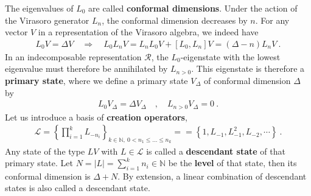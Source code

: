\documentclass[12pt, a4paper]{article}
\theoremstyle{break}
\begin{document}
The eigenvalues of $L_0$ are called \textbf{conformal dimensions}. Under the action of the Virasoro generator $L_n$, the conformal dimension decreases by $n$. For any vector $V$ in a representation of the Virasoro algebra, we indeed have 
\begin{align}
 L_0V{} = \Delta V{} \quad \Rightarrow\quad  L_0 L_nV{} = L_nL_0V{} + [L_0, L_n] V{}  = (\Delta-n)L_nV{} \ .
\end{align}
In an indecomposable representation $\mathcal{R}$, the $L_0$-eigenstate with the lowest eigenvalue must therefore be annihilated by $L_{n>0}$. This eigenstate is therefore a \textbf{primary state}, where we define a primary state $V_\Delta$ of conformal dimension $\Delta$ by 
\begin{align}
  \boxed{L_0 V_\Delta = \Delta V_\Delta \quad , \quad L_{n>0} V_\Delta = 0}\ .
 \end{align}
Let us introduce a basis of \textbf{creation operators},
\begin{align}
 \mathcal{L} = \left\{\prod_{i=1}^k L_{-n_i} \right\}_{k\in\mathbb{N},\ 0<n_1\leq \dots \leq n_k}==\left\{1, L_{-1}, L_{-1}^2, L_{-2},\cdots \right\}\ .
 \label{lcm}
\end{align}
Any state of the type $L V{}$ with $L\in\mathcal{L}$ is called a \textbf{descendant state} of that primary state. Let  $N=|L|=\sum_{i=1}^k n_i \in\mathbb{N}$ be the  \textbf{level} of that state, then its conformal dimension is $\Delta+N$. By extension, a linear combination of descendant states is also called a descendant state. 
\end{document}
